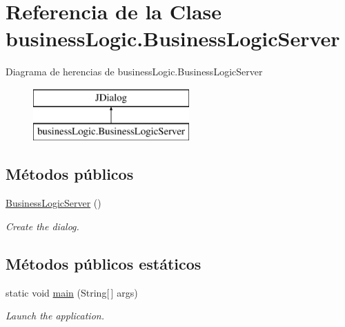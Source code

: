 \hypertarget{classbusiness_logic_1_1_business_logic_server}{}\section{Referencia de la Clase business\+Logic.\+Business\+Logic\+Server}
\label{classbusiness_logic_1_1_business_logic_server}
Diagrama de herencias de business\+Logic.\+Business\+Logic\+Server\begin{figure}[H]
\begin{center}
\leavevmode
\includegraphics[height=2.000000cm]{classbusiness_logic_1_1_business_logic_server}
\end{center}
\end{figure}
\subsection*{Métodos públicos}
\begin{DoxyCompactItemize}
\item 
\mbox{\hyperlink{classbusiness_logic_1_1_business_logic_server_a45e022d6b8b68567423caab4157e2784}{Business\+Logic\+Server}} ()
\begin{DoxyCompactList}\small\item\em Create the dialog. \end{DoxyCompactList}\end{DoxyCompactItemize}
\subsection*{Métodos públicos estáticos}
\begin{DoxyCompactItemize}
\item 
static void \mbox{\hyperlink{classbusiness_logic_1_1_business_logic_server_a978c1596ce77baed488f137fc96a4fe8}{main}} (String\mbox{[}$\,$\mbox{]} args)
\begin{DoxyCompactList}\small\item\em Launch the application. \end{DoxyCompactList}\end{DoxyCompactItemize}

